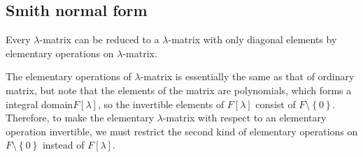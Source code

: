\documentclass{book}
\theoremstyle{definition}
\begin{document}
\subsection{Smith normal form}
Every $\lambda$-matrix can be reduced to a $\lambda$-matrix with only diagonal elements by elementary operations on $\lambda$-matrix. \par
The elementary operations of $\lambda$-matrix is essentially the same as that of ordinary matrix, but note that the elements of the matrix are polynomials, which forms a integral domain$F[\lambda]$, so the invertible elements of $F[\lambda]$ consist of $F\setminus\left\{0\right\}$. Therefore, to make the elementary $\lambda$-matrix with respect to an elementary operation invertible, we must restrict the second kind of elementary operations on $F\setminus\left\{0\right\}$ instead of $F[\lambda]$.
\end{document}
